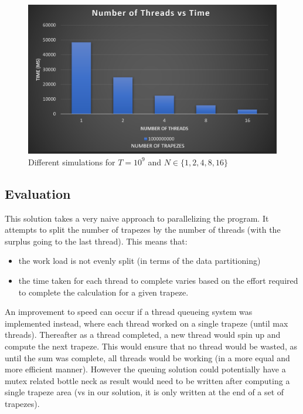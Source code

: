 \begin{figure}
  \centering
  \includegraphics[width=\linewidth]{Figures/highTrap.png}
  \caption{Different simulations for $T=10^9$ and $N \in \{1, 2, 4, 8, 16\}$}
  \label{fig:hightrap}
\end{figure}

\subsection{Evaluation}
This solution takes a very naive approach to parallelizing the program. 
It attempts to split the number of trapezes by the number of threads
(with the surplus going to the last thread). This means that:

\begin{itemize}
  \item the work load is not evenly split (in terms of the data partitioning)
  \item the time taken for each thread to complete varies based on the effort 
  required to complete the calculation for a given trapeze.
\end{itemize}

An improvement to speed can occur if a thread queueing system was implemented 
instead, where each thread worked on a single trapeze (until max threads).
Thereafter as a thread completed, a new thread would spin up and compute the 
next trapeze. This would ensure that no thread would be wasted, as until the 
sum was complete, all threads would be working (in a more equal and more 
efficient manner). However the queuing solution could potentially have a mutex 
related bottle neck as result would need to be written after computing a single 
trapeze area (vs in our solution, it is only written at the end of a set of 
trapezes).
